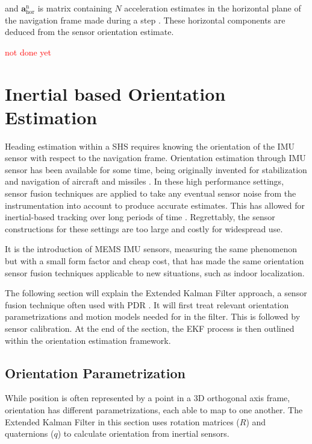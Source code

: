 and $ \mathbf{a}^\mathrm{n}_\mathrm{hor} $ is matrix containing $ N $ acceleration estimates in the horizontal plane of the navigation frame made during a step \cite{Combettes2015}. These horizontal components are deduced from the sensor orientation estimate. \par 
\textcolor{red}{not done yet}
\newpage 

\section{Inertial based Orientation Estimation}
\label{sec:rw-orientation_estimation}
Heading estimation within a \acl{SHS} requires knowing the orientation of the \ac{IMU} sensor with respect to the navigation frame. Orientation estimation through \ac{IMU} sensor has been available for some time, being originally invented for stabilization and navigation of aircraft and missiles \cite{titterton2004strapdown}. In these high performance settings, sensor fusion techniques are applied to take any eventual sensor noise from the instrumentation into account to produce accurate estimates. This has allowed for inertial-based tracking over long periods of time \cite{Harle2013}. Regrettably, the sensor constructions for these settings are too large and costly for widespread use.\par  
It is the introduction of \ac{MEMS} \ac{IMU} sensors, measuring the same phenomenon but with a small form factor and cheap cost, that has made the same orientation sensor fusion techniques applicable to new situations, such as indoor localization. \par 
The following section will explain the Extended Kalman Filter approach, a sensor fusion technique often used with PDR \cite{Michel2015a,Michel2018, Diaz2014}. It will first treat relevant orientation parametrizations and motion models needed for in the filter. This is followed by sensor calibration. At the end of the section, the EKF process is then outlined within the orientation estimation framework.


\subsection{Orientation Parametrization}
While position is often represented by a point in a 3D orthogonal axis frame, orientation has different parametrizations, each able to map to one another. The Extended Kalman Filter in this section uses rotation matrices ($R$) and quaternions ($q$) to calculate orientation from inertial sensors.

